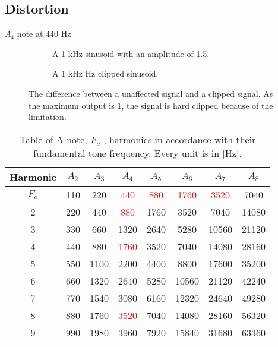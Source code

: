 \subsection{Distortion}

$A_4$ note at 440 Hz

\begin{figure}[H]
\centering
\begin{subfigure}[t]{0.47\textwidth}
	
	\caption{A 1 kHz sinusoid with an amplitude of 1.5.}
	\label{fig:EvenTHD}
\end{subfigure}
\hspace{6mm} 
\begin{subfigure}[t]{0.47\textwidth}
	
	\caption{A 1 kHz Hz clipped sinusoid.}
	\label{fig:OddTHD}
\end{subfigure}
\caption{The difference between a unaffected signal and a clipped signal. As the maximum output is 1, the signal is hard clipped because of the limitation.}
\end{figure}


\begin{table}[H]
\centering
{}
\begin{tabular}{S[table-format=1]ccccccc} \toprule
    {Harmonic} & {$A_2$} & {$A_3$} & {$A_4$} & {$A_5$} & {$A_6$} & {$A_7$} & {$A_8$} \\ \midrule 
    $F_o$  & 110  & 220  & \textcolor{red}{440}   & \textcolor{red}{880}  & \textcolor{red}{1760}  & \textcolor{red}{3520}   & 7040   \\       & 220  & 440  & \textcolor{red}{880}   & 1760 & 3520   & 7040   & 14080  \\ 
    3      & 330  & 660  & 1320  & 2640 & 5280   & 10560  & 21120  \\
    4      & 440  & 880  & \textcolor{red}{1760}  & 3520 & 7040   & 14080  & 28160  \\ 
    5      & 550  & 1100 & 2200  & 4400 & 8800   & 17600  & 35200  \\       & 660  & 1320 & 2640  & 5280 & 10560  & 21120  & 42240  \\
    7      & 770  & 1540 & 3080  & 6160 & 12320  & 24640  & 49280  \\
    8      & 880  & 1760 & \textcolor{red}{3520}  & 7040 & 14080  & 28160  & 56320  \\ 
    9      & 990  & 1980 & 3960  & 7920 & 15840  & 31680  & 63360  \\ \bottomrule
\end{tabular}
\caption{Table of A-note, $F_o$ , harmonics in accordance with their fundamental tone frequency. Every unit is in [Hz].\citep{sou:NoteA}}
\end{table}


